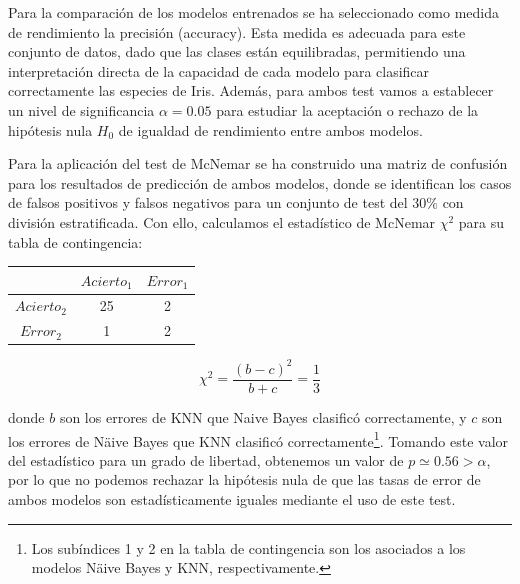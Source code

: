 \documentclass[a4paper,12pt]{article}
\begin{document}
Para la comparación de los modelos entrenados se ha seleccionado como medida de rendimiento la precisión (accuracy). Esta medida es adecuada para este conjunto de datos, dado que las clases están equilibradas, permitiendo una interpretación directa de la capacidad de cada modelo para clasificar correctamente las especies de Iris. Además, para ambos test vamos a establecer un nivel de significancia $\alpha = 0.05$ para estudiar la aceptación o rechazo de la hipótesis nula $H_0$ de igualdad de rendimiento entre ambos modelos.

Para la aplicación del test de McNemar se ha construido una matriz de confusión para los resultados de predicción de ambos modelos, donde se identifican los casos de falsos positivos y falsos negativos para un conjunto de test del $30\%$ con división estratificada. Con ello, calculamos el estadístico de McNemar $\chi^2$ para su tabla de contingencia:

\vspace{1em}

\begin{minipage}[c]{0.45\textwidth}
    \centering
    \begin{tabular}{c|c|c|}
                    & $Acierto_1$ & $Error_1$ \\
        \hline
        $Acierto_2$ & 25          & 2         \\
        \hline
        $Error_2$   & 1           & 2         \\
        \hline
    \end{tabular}
\end{minipage}%
\hfill
\begin{minipage}[c]{0.45\textwidth}
    \centering
    \begin{equation}
        \chi^2 = \frac{(b-c)^2}{b+c} = \frac{1}{3}
    \end{equation}
\end{minipage}

\vspace{1em}

\noindent
donde $b$ son los errores de KNN que Naive Bayes clasificó correctamente, y $c$ son los errores de Näive Bayes que KNN clasificó correctamente\footnote{Los subíndices 1 y 2 en la tabla de contingencia son los asociados a los modelos Näive Bayes y KNN, respectivamente.}. Tomando este valor del estadístico para un grado de libertad, obtenemos un valor de $p\simeq 0.56>\alpha$, por lo que no podemos rechazar la hipótesis nula de que las tasas de error de ambos modelos son estadísticamente iguales mediante el uso de este test.
\end{document}
